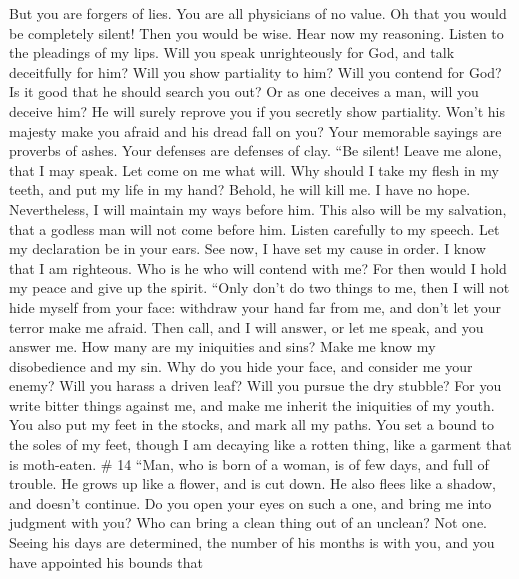 But you are forgers of lies. You are all physicians of no value.
 Oh that you would be completely silent! Then you would be
wise.  Hear now my reasoning. Listen to the pleadings of my
lips.  Will you speak unrighteously for God, and talk
deceitfully for him?  Will you show partiality to him? Will
you contend for God?  Is it good that he should search you
out? Or as one deceives a man, will you deceive him?  He
will surely reprove you if you secretly show partiality. 
Won't his majesty make you afraid and his dread fall on you?
 Your memorable sayings are proverbs of ashes. Your
defenses are defenses of clay.  ``Be silent! Leave me
alone, that I may speak. Let come on me what will.  Why
should I take my flesh in my teeth, and put my life in my hand?
 Behold, he will kill me. I have no hope. Nevertheless, I
will maintain my ways before him.  This also will be my
salvation, that a godless man will not come before him. 
Listen carefully to my speech. Let my declaration be in your ears.
 See now, I have set my cause in order. I know that I am
righteous.  Who is he who will contend with me? For then
would I hold my peace and give up the spirit.  ``Only don't
do two things to me, then I will not hide myself from your face:
 withdraw your hand far from me, and don't let your terror
make me afraid.  Then call, and I will answer, or let me
speak, and you answer me.  How many are my iniquities and
sins? Make me know my disobedience and my sin.  Why do you
hide your face, and consider me your enemy?  Will you
harass a driven leaf? Will you pursue the dry stubble?  For
you write bitter things against me, and make me inherit the iniquities
of my youth.  You also put my feet in the stocks, and mark
all my paths. You set a bound to the soles of my feet, 
though I am decaying like a rotten thing, like a garment that is
moth-eaten. \# 14  ``Man, who is born of a woman, is of few
days, and full of trouble.  He grows up like a flower, and
is cut down. He also flees like a shadow, and doesn't continue.
 Do you open your eyes on such a one, and bring me into
judgment with you?  Who can bring a clean thing out of an
unclean? Not one.  Seeing his days are determined, the
number of his months is with you, and you have appointed his bounds that
